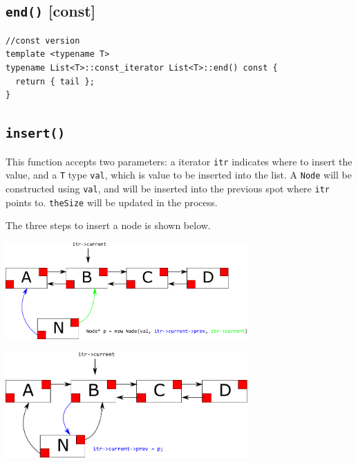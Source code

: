 \documentclass[12pt]{book}
\begin{document}
\subsection{\texttt{end()} [const]}
\label{sec:orgc4900be}
\begin{verbatim}
//const version 
template <typename T>
typename List<T>::const_iterator List<T>::end() const {
  return { tail };
}
\end{verbatim}
\subsection{\texttt{insert()}}
\label{sec:org4b7f2bf}
This function accepts two parameters: a iterator \texttt{itr} indicates where to insert the value, and a \texttt{T} type \texttt{val}, which is value to be inserted into the list. A \texttt{Node} will be constructed using \texttt{val}, and will be inserted into the previous spot where \texttt{itr} points to. \texttt{theSize} will be updated in the process.

The three steps to insert a node is shown below.

\begin{center}
\includegraphics[width=350px]{./img/List-insert-1.pdf}
\end{center}

\begin{center}
\includegraphics[width=350px]{./img/List-insert-2.pdf}
\end{center}
\end{document}
